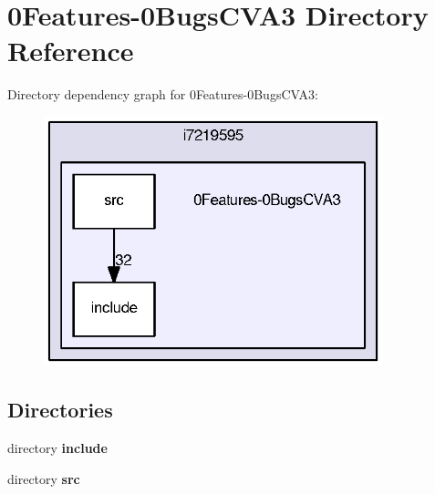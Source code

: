 \section{0\-Features-\/0\-Bugs\-C\-V\-A3 Directory Reference}
\label{dir_534dfcd299503325eced2afc11388554}
Directory dependency graph for 0\-Features-\/0\-Bugs\-C\-V\-A3\-:\nopagebreak
\begin{figure}[H]
\begin{center}
\leavevmode
\includegraphics[width=278pt]{dir_534dfcd299503325eced2afc11388554_dep}
\end{center}
\end{figure}
\subsection*{Directories}
\begin{DoxyCompactItemize}
\item 
directory {\bf include}
\item 
directory {\bf src}
\end{DoxyCompactItemize}
